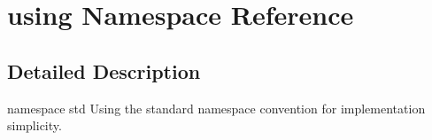 \hypertarget{namespaceusing}{\section{using Namespace Reference}
\label{namespaceusing}
}


\subsection{Detailed Description}
namespace std Using the standard namespace convention for implementation simplicity. 